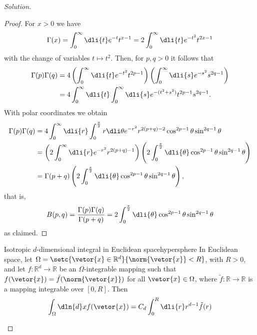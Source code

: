 \begin{proof}[Solution]
   \begin{proof}
      For \(x > 0\) we have
      \begin{equation*}
         \Gamma(x) = \int_0^\infty \dli{t} e^{-t} t^{x - 1} = 2 \int_0^\infty \dli{t} e^{-t^2}t^{2x - 1}
      \end{equation*}
      with the change of variables \(t \mapsto t^2\). Then, for \(p, q > 0\) it follows that
      \begin{align*}
         \Gamma(p)\Gamma(q) &= 4 \left(\int_0^\infty\dli{t} e^{-t^2} t^{2p - 1}\right)\left(\int_0^\infty\dli{s} e^{-s^2} s^{2q - 1}\right)\\
                            &= 4 \int_0^\infty \dli{t} \int_0^\infty \dli{s} e^{-(t^2 + s^2)} t^{2p - 1} s^{2q - 1}.
      \end{align*}
      With polar coordinates we obtain
      \begin{align*}
         \Gamma(p)\Gamma(q) &= 4 \int_0^\infty \dli{r} \int_0^{\frac{\pi}{2}} r\dli\theta e^{-r^2}r^{2(p+q) - 2} \cos^{2p - 1}\theta \sin^{2q-1}\theta\\
                            &= \left(2 \int_0^{\infty}\dli{r} e^{-r^2}r^{2(p+q)-1}\right)\left(2 \int_0^{\frac{\pi}{2}}\dli{\theta} \cos^{2p - 1}\theta \sin^{2q - 1}\theta\right)\\
                            &= \Gamma(p + q) \left(2 \int_0^{\frac{\pi}{2}}\dli{\theta} \cos^{2p - 1}\theta \sin^{2q - 1}\theta\right),
      \end{align*}
      that is,
      \begin{equation*}
         B(p,q) = \frac{\Gamma(p)\Gamma(q)}{\Gamma(p+q)} = 2 \int_0^{\frac{\pi}{2}}\dli{\theta} \cos^{2p - 1}\theta \sin^{2q - 1}\theta
      \end{equation*}
      as claimed.
   \end{proof}
   \begin{lemma}{Isotropic \(d\)-dimensional integral in Euclidean space}{hypersphere}
      In Euclidean space, let \(\Omega = \setc{\vetor{x} \in \mathbb{R}^d}{\norm{\vetor{x}} < R}\), with \(R > 0\), and let \(f : \mathbb{R}^d \to \mathbb{R}\) be an \(\Omega\)-integrable mapping such that \(f(\vetor{x}) = \tilde{f}(\norm{\vetor{x}})\) for all \(\vetor{x} \in \Omega\), where \(\tilde{f} : \mathbb{R} \to \mathbb{R}\) is a mapping integrable over \([0, R]\). Then
      \begin{equation*}
         \int_{\Omega} \dln{d}x f(\vetor{x}) = C_d \int_0^R \dli{r} r^{d - 1}\tilde{f}(r)
      \end{equation*}

\end{lemma}
\end{proof}
